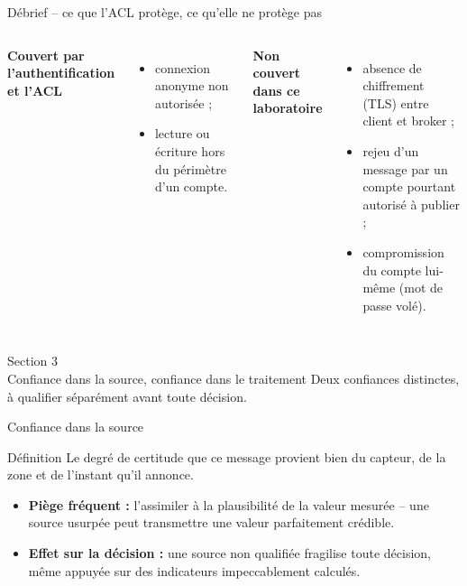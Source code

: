 \documentclass[aspectratio=169]{beamer}
\begin{document}
\begin{frame}{Débrief -- ce que l'ACL protège, ce qu'elle ne protège pas}
  \begin{columns}[T]
    \textbf{Couvert par l'authentification et l'ACL}
    \begin{itemize}
      \item connexion anonyme non autorisée ;
      \item lecture ou écriture hors du périmètre d'un compte.
    \end{itemize}
    \textbf{Non couvert dans ce laboratoire}
    \begin{itemize}
      \item absence de chiffrement (TLS) entre client et broker ;
      \item rejeu d'un message par un compte pourtant autorisé à publier ;
      \item compromission du compte lui-même (mot de passe volé).
    \end{itemize}
  \end{columns}
  \vfill
\end{frame}

\begin{frame}[plain]
  \centering
  \Huge Section 3\\[3mm]
  \Large Confiance dans la source, confiance dans le traitement
  \vfill
  \normalsize Deux confiances distinctes, à qualifier séparément avant toute décision.
\end{frame}

\begin{frame}{Confiance dans la source}
  \begin{block}{Définition}
    Le degré de certitude que ce message provient bien du capteur, de la zone et de l'instant qu'il annonce.
  \end{block}
  \begin{itemize}
    \item \textbf{Piège fréquent :} l'assimiler à la plausibilité de la valeur mesurée -- une source usurpée peut transmettre une valeur parfaitement crédible.
    \item \textbf{Effet sur la décision :} une source non qualifiée fragilise toute décision, même appuyée sur des indicateurs impeccablement calculés.
  \end{itemize}
\end{frame}
\end{document}
